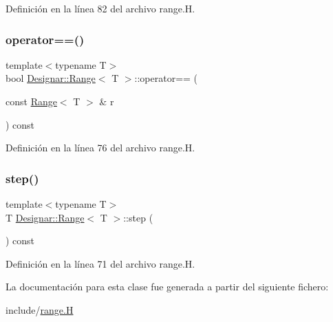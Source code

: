 Definición en la línea 82 del archivo range.\+H.

\mbox{\label{class_designar_1_1_range_ac15a931a2a2de890571f85cff64f6891}} 
\subsubsection{\texorpdfstring{operator==()}{operator==()}}
{\footnotesize\ttfamily template$<$typename T$>$ \\
bool \hyperlink{class_designar_1_1_range}{Designar\+::\+Range}$<$ T $>$\+::operator== (\begin{DoxyParamCaption}\item[{const \hyperlink{class_designar_1_1_range}{Range}$<$ T $>$ \&}]{r }\end{DoxyParamCaption}) const\hspace{0.3cm}{\ttfamily [inline]}}



Definición en la línea 76 del archivo range.\+H.

\mbox{\label{class_designar_1_1_range_a831f82b8651e4b4a437aa786288b5aef}} 
\subsubsection{\texorpdfstring{step()}{step()}}
{\footnotesize\ttfamily template$<$typename T$>$ \\
T \hyperlink{class_designar_1_1_range}{Designar\+::\+Range}$<$ T $>$\+::step (\begin{DoxyParamCaption}{ }\end{DoxyParamCaption}) const\hspace{0.3cm}{\ttfamily [inline]}}



Definición en la línea 71 del archivo range.\+H.



La documentación para esta clase fue generada a partir del siguiente fichero\+:\begin{DoxyCompactItemize}
\item 
include/\hyperlink{range_8_h}{range.\+H}\end{DoxyCompactItemize}
